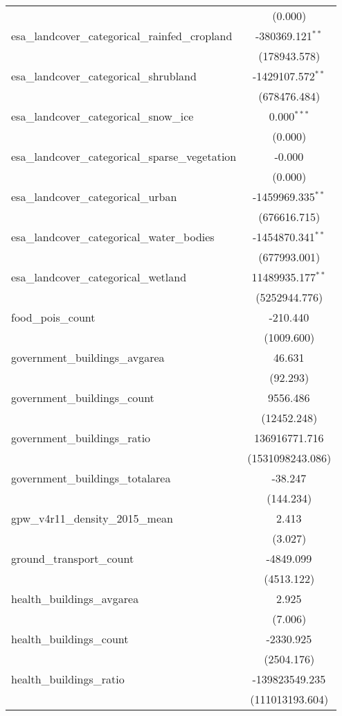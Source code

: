 \begin{table}[!htbp]
\begin{tabular}{@{\extracolsep{5pt}}lc}
  & (0.000) \\
 esa_landcover_categorical_rainfed_cropland & -380369.121$^{**}$ \\
  & (178943.578) \\
 esa_landcover_categorical_shrubland & -1429107.572$^{**}$ \\
  & (678476.484) \\
 esa_landcover_categorical_snow_ice & 0.000$^{***}$ \\
  & (0.000) \\
 esa_landcover_categorical_sparse_vegetation & -0.000$^{}$ \\
  & (0.000) \\
 esa_landcover_categorical_urban & -1459969.335$^{**}$ \\
  & (676616.715) \\
 esa_landcover_categorical_water_bodies & -1454870.341$^{**}$ \\
  & (677993.001) \\
 esa_landcover_categorical_wetland & 11489935.177$^{**}$ \\
  & (5252944.776) \\
 food_pois_count & -210.440$^{}$ \\
  & (1009.600) \\
 government_buildings_avgarea & 46.631$^{}$ \\
  & (92.293) \\
 government_buildings_count & 9556.486$^{}$ \\
  & (12452.248) \\
 government_buildings_ratio & 136916771.716$^{}$ \\
  & (1531098243.086) \\
 government_buildings_totalarea & -38.247$^{}$ \\
  & (144.234) \\
 gpw_v4r11_density_2015_mean & 2.413$^{}$ \\
  & (3.027) \\
 ground_transport_count & -4849.099$^{}$ \\
  & (4513.122) \\
 health_buildings_avgarea & 2.925$^{}$ \\
  & (7.006) \\
 health_buildings_count & -2330.925$^{}$ \\
  & (2504.176) \\
 health_buildings_ratio & -139823549.235$^{}$ \\
  & (111013193.604) \\

\end{tabular}
\end{table}
